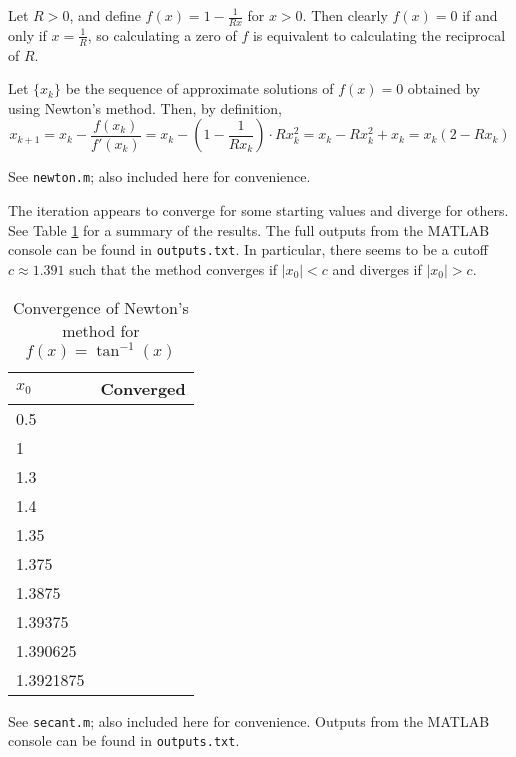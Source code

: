 \documentclass{homework}
\newcommand{\xmark}{\ding{55}}
\begin{document}
\maketitle

\question Let $R > 0$, and define $f(x) = 1 - \frac{1}{Rx}$ for $x > 0$. Then clearly $f(x) = 0$ if and only if $x = \frac{1}{R}$, so calculating a zero of $f$ is equivalent to calculating the reciprocal of $R$.

Let $\{x_k\}$ be the sequence of approximate solutions of $f(x) = 0$ obtained by using Newton's method. Then, by definition,
\begin{equation}
	x_{k+1} = x_k - \frac{f(x_k)}{f'(x_k)} = x_k - \left(1-\frac{1}{Rx_k}\right)\cdot Rx_k^2 = x_k - Rx_k^2 + x_k = x_k(2-Rx_k)
\end{equation}

\question 
See \verb*|newton.m|; also included here for convenience.

The iteration appears to converge for some starting values and diverge for others. See Table \ref{table:newton} for a summary of the results. The full outputs from the MATLAB console can be found in \verb*|outputs.txt|. In particular, there seems to be a cutoff $c \approx 1.391$ such that the method converges if $|x_0| < c$ and diverges if $|x_0| > c$.

\newcommand{\conv}{\textcolor{green!50!black}{\checkmark}}
\newcommand{\nconv}{\textcolor{red!50!black}{\xmark}}
\begin{table}[t]
	\centering
	\begin{tabular}{@{}ll@{}}
		\toprule
		$x_0$ & Converged \\
		\midrule
		0.5  & \conv \\ 
		1 & \conv \\
		1.3 & \conv \\
		1.4 & \nconv \\ 
		1.35 & \conv \\ 
		1.375 &  \conv \\
		1.3875 & \conv \\
		1.39375 & \nconv \\
		1.390625 & \conv \\
		1.3921875 & \nconv \\
		\bottomrule
	\end{tabular}
	\caption{Convergence of Newton's method for $f(x) = \tan^{-1}(x)$}
	\label{table:newton}
\end{table}

\question See \verb*|secant.m|; also included here for convenience. Outputs from the MATLAB console can be found in \verb*|outputs.txt|.

\end{document}
